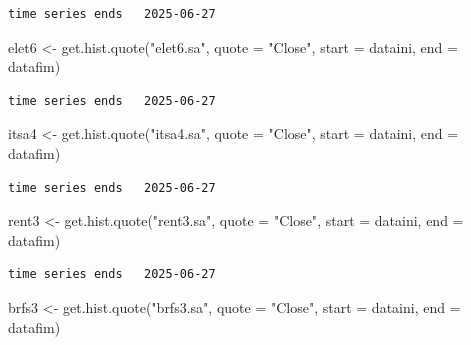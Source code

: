 \documentclass[
  letterpaper,
  DIV=11,
  numbers=noendperiod]{scrartcl}
\newenvironment{Shaded}{\begin{snugshade}}{\end{snugshade}}
\newcommand{\AttributeTok}[1]{\textcolor[rgb]{0.40,0.45,0.13}{#1}}
\newcommand{\FunctionTok}[1]{\textcolor[rgb]{0.28,0.35,0.67}{#1}}
\newcommand{\NormalTok}[1]{\textcolor[rgb]{0.00,0.23,0.31}{#1}}
\newcommand{\OtherTok}[1]{\textcolor[rgb]{0.00,0.23,0.31}{#1}}
\newcommand{\StringTok}[1]{\textcolor[rgb]{0.13,0.47,0.30}{#1}}
\begin{document}
\begin{verbatim}
time series ends   2025-06-27
\end{verbatim}

\begin{Shaded}
\begin{Highlighting}[]
\NormalTok{elet6 }\OtherTok{\textless{}{-}} \FunctionTok{get.hist.quote}\NormalTok{(}\StringTok{"elet6.sa"}\NormalTok{,  }\AttributeTok{quote =} \StringTok{"Close"}\NormalTok{, }\AttributeTok{start =}\NormalTok{ dataini, }\AttributeTok{end =}\NormalTok{ datafim)}
\end{Highlighting}
\end{Shaded}

\begin{verbatim}
time series ends   2025-06-27
\end{verbatim}

\begin{Shaded}
\begin{Highlighting}[]
\NormalTok{itsa4  }\OtherTok{\textless{}{-}} \FunctionTok{get.hist.quote}\NormalTok{(}\StringTok{"itsa4.sa"}\NormalTok{,  }\AttributeTok{quote =} \StringTok{"Close"}\NormalTok{, }\AttributeTok{start =}\NormalTok{ dataini, }\AttributeTok{end =}\NormalTok{ datafim)}
\end{Highlighting}
\end{Shaded}

\begin{verbatim}
time series ends   2025-06-27
\end{verbatim}

\begin{Shaded}
\begin{Highlighting}[]
\NormalTok{rent3  }\OtherTok{\textless{}{-}} \FunctionTok{get.hist.quote}\NormalTok{(}\StringTok{"rent3.sa"}\NormalTok{,  }\AttributeTok{quote =} \StringTok{"Close"}\NormalTok{, }\AttributeTok{start =}\NormalTok{ dataini, }\AttributeTok{end =}\NormalTok{ datafim)}
\end{Highlighting}
\end{Shaded}

\begin{verbatim}
time series ends   2025-06-27
\end{verbatim}

\begin{Shaded}
\begin{Highlighting}[]
\NormalTok{brfs3  }\OtherTok{\textless{}{-}} \FunctionTok{get.hist.quote}\NormalTok{(}\StringTok{"brfs3.sa"}\NormalTok{,  }\AttributeTok{quote =} \StringTok{"Close"}\NormalTok{, }\AttributeTok{start =}\NormalTok{ dataini, }\AttributeTok{end =}\NormalTok{ datafim)}
\end{Highlighting}
\end{Shaded}
\end{document}
